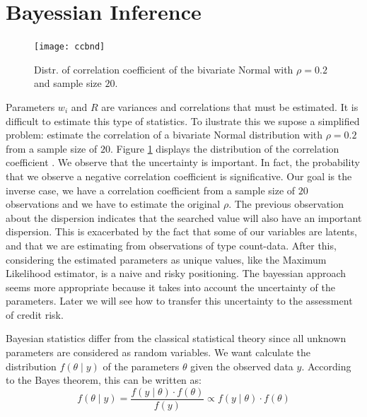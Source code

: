 \documentclass[11pt,fleqn]{book} %
\begin{document}
\section{Bayessian Inference}

\begin{figure}
	\vspace{-20pt}
	\begin{center}
		\texttt{[image: ccbnd]}
	\end{center}
	\vspace{-10pt}
	\caption{Distr. of correlation coefficient of the bivariate Normal with $\rho=0.2$ and sample size $20$.}
	\vspace{-10pt}
	\label{fig:ccbnd}
\end{figure}
Parameters $w_i$ and $R$ are variances and correlations that must be 
estimated. It is difficult to estimate this type of statistics. To ilustrate
this we supose a simplified problem: estimate the correlation of a bivariate 
Normal distribution with $\rho=0.2$ from a sample size of $20$. Figure 
\ref{fig:ccbnd} displays the distribution of the correlation 
coefficient \cite[pp. 217-221]{kenney:1951}. We observe that the 
uncertainty is important. In fact, the probability that we observe 
a negative correlation coefficient is significative. Our goal
is the inverse case, we have a correlation coefficient from a sample
size of $20$ observations and we have to estimate the original $\rho$.
The previous observation about the dispersion indicates that the 
searched value will also have an important dispersion.
This is exacerbated by the fact that some of our variables
are latents, and that we are estimating from observations of type
count-data. After this, considering the estimated parameters as 
unique values, like the Maximum Likelihood estimator, is a naive and 
risky positioning. The bayessian approach seems  more appropriate 
\cite{gossl:2005} \cite{tarashev:2010} because it takes into account 
the uncertainty of the parameters. Later we will see how to transfer 
this uncertainty to the assessment of credit risk.

Bayesian statistics differ from the classical statistical 
theory since all unknown parameters are considered as random 
variables. We want calculate the distribution $f(\theta \mid y)$ 
of the parameters $\theta$ given the observed data $y$. 
According to the Bayes theorem, this can be written as:
\begin{displaymath}
	f(\theta \mid y) = \frac{f(y \mid \theta) \cdot f(\theta)}{f(y)} \propto f(y \mid \theta) \cdot f(\theta)
\end{displaymath}
\end{document}
